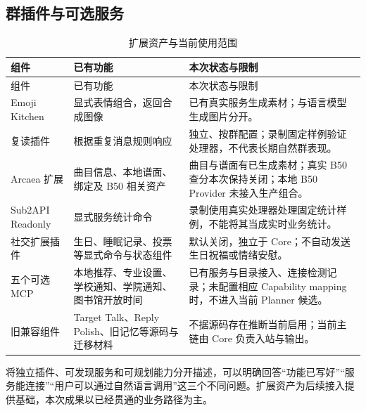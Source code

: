 \subsection{群插件与可选服务}
\begin{longtable}{@{}L{31mm}L{51mm}L{67mm}@{}}
\caption{扩展资产与当前使用范围}\\\toprule
组件 & 已有功能 & 本次状态与限制\\\midrule\endfirsthead
\toprule 组件 & 已有功能 & 本次状态与限制\\\midrule\endhead
Emoji Kitchen & 显式表情组合，返回合成图像 & 已有真实服务生成素材；与语言模型生成图片分开。\\
复读插件 & 根据重复消息规则响应 & 独立、按群配置；录制固定样例验证处理器，不代表长期自然群表现。\\
Arcaea 扩展 & 曲目信息、本地谱面、绑定及 B50 相关资产 & 曲目与谱面有已生成素材；真实 B50 查分本次保持关闭；本地 B50 Provider 未接入生产组合。\\
Sub2API Readonly & 显式服务统计命令 & 录制使用真实处理器处理固定统计样例，不能将其当成实时业务统计。\\
社交扩展插件 & 生日、睡眠记录、投票等显式命令与状态组件 & 默认关闭，独立于 Core；不自动发送生日祝福或情绪安慰。\\
五个可选 MCP & 本地推荐、专业设置、学校通知、学院通知、图书馆开放时间 & 已有服务与目录接入、连接检测记录；未配置相应 Capability mapping 时，不进入当前 Planner 候选。\\
旧兼容组件 & Target Talk、Reply Polish、旧记忆等源码与迁移材料 & 不据源码存在推断当前启用；当前主链由 Core 负责入站与输出。\\\bottomrule
\end{longtable}

将独立插件、可发现服务和可规划能力分开描述，可以明确回答“功能已写好”“服务能连接”“用户可以通过自然语言调用”这三个不同问题。扩展资产为后续接入提供基础，本次成果以已经贯通的业务路径为主。
